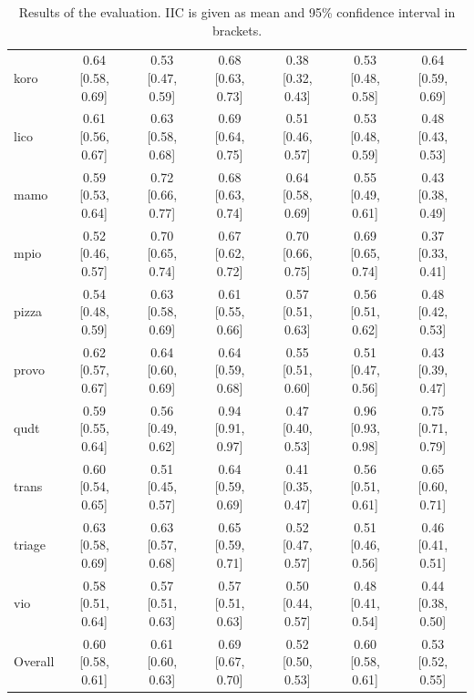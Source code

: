 \begin{table}[ht]
\begin{widepage}
\begin{tabular}{|l|cccccc|}
      koro & 0.64 [0.58, 0.69] & 0.53 [0.47, 0.59] & 0.68 [0.63, 0.73] & 0.38 [0.32, 0.43] & 0.53 [0.48, 0.58] & 0.64 [0.59, 0.69] \\
      lico & 0.61 [0.56, 0.67] & 0.63 [0.58, 0.68] & 0.69 [0.64, 0.75] & 0.51 [0.46, 0.57] & 0.53 [0.48, 0.59] & 0.48 [0.43, 0.53] \\
      mamo & 0.59 [0.53, 0.64] & 0.72 [0.66, 0.77] & 0.68 [0.63, 0.74] & 0.64 [0.58, 0.69] & 0.55 [0.49, 0.61] & 0.43 [0.38, 0.49] \\
      mpio & 0.52 [0.46, 0.57] & 0.70 [0.65, 0.74] & 0.67 [0.62, 0.72] & 0.70 [0.66, 0.75] & 0.69 [0.65, 0.74] & 0.37 [0.33, 0.41] \\
      pizza & 0.54 [0.48, 0.59] & 0.63 [0.58, 0.69] & 0.61 [0.55, 0.66] & 0.57 [0.51, 0.63] & 0.56 [0.51, 0.62] & 0.48 [0.42, 0.53] \\
      provo & 0.62 [0.57, 0.67] & 0.64 [0.60, 0.69] & 0.64 [0.59, 0.68] & 0.55 [0.51, 0.60] & 0.51 [0.47, 0.56] & 0.43 [0.39, 0.47] \\
      qudt & 0.59 [0.55, 0.64] & 0.56 [0.49, 0.62] & 0.94 [0.91, 0.97] & 0.47 [0.40, 0.53] & 0.96 [0.93, 0.98] & 0.75 [0.71, 0.79] \\
      trans & 0.60 [0.54, 0.65] & 0.51 [0.45, 0.57] & 0.64 [0.59, 0.69] & 0.41 [0.35, 0.47] & 0.56 [0.51, 0.61] & 0.65 [0.60, 0.71] \\
      triage & 0.63 [0.58, 0.69] & 0.63 [0.57, 0.68] & 0.65 [0.59, 0.71] & 0.52 [0.47, 0.57] & 0.51 [0.46, 0.56] & 0.46 [0.41, 0.51] \\
      vio & 0.58 [0.51, 0.64] & 0.57 [0.51, 0.63] & 0.57 [0.51, 0.63] & 0.50 [0.44, 0.57] & 0.48 [0.41, 0.54] & 0.44 [0.38, 0.50]\\
      \hline
      Overall & 0.60 [0.58, 0.61] & 0.61 [0.60, 0.63] & 0.69 [0.67, 0.70] & 0.52 [0.50, 0.53] & 0.60 [0.58, 0.61] & 0.53 [0.52, 0.55] \\
      \hline
    \end{tabular}
  \end{widepage}
  \caption{Results of the evaluation. IIC is given as mean and 95\% confidence interval in brackets.}
\end{table}

